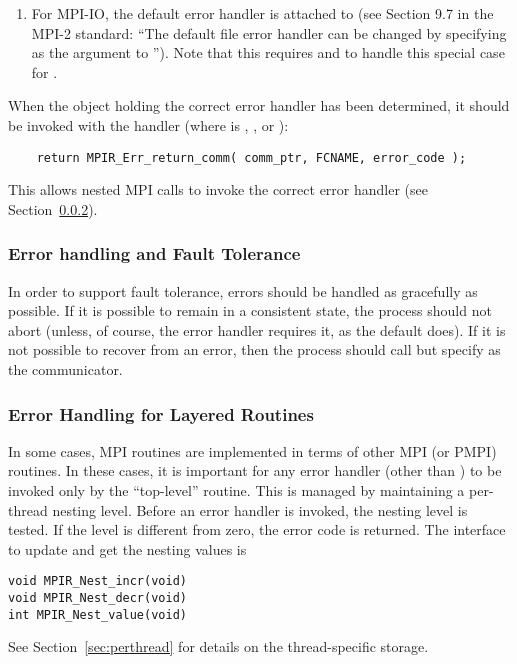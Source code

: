 \documentclass{article}
\begin{document}
\begin{enumerate}
\item For MPI-IO, the default error handler is attached to
   (see Section 9.7 in the MPI-2 standard: ``The default
  file error handler can be changed by specifying  as the
   argument to '').  Note that this
  requires  and
   to handle this special case for
  .  
\end{enumerate}

When the object holding the correct error handler has been determined, it
should be invoked with the 
 handler (where  is ,
, or ): %
\begin{verbatim}
    return MPIR_Err_return_comm( comm_ptr, FCNAME, error_code );
\end{verbatim}
This allows nested MPI calls to invoke the correct error handler (see
Section~\ref{sec:err-handling-nested}).  

\subsubsection{Error handling and Fault Tolerance}
\label{sec:errs-and-faults}
In order to support fault tolerance, errors should be handled as
gracefully as possible.  If it is possible to remain in a consistent
state, the process should not abort (unless, of course, the error
handler requires it, as the default  does).  
If it is not possible to recover from an error, then the process
should call  but specify  as the
communicator.  

\subsubsection{Error Handling for Layered Routines}
\label{sec:err-handling-nested}
In some cases, MPI routines are implemented in terms of other MPI (or
PMPI) routines.  In these cases, it is important for any error handler
(other than ) to be invoked only by the
``top-level'' routine.  
This is managed by maintaining a per-thread nesting level.  Before an error
handler is invoked, the nesting level is tested.  If the level is different
from zero, the error code is returned.  The interface to update and
get the nesting values is
\begin{verbatim}
void MPIR_Nest_incr(void)
void MPIR_Nest_decr(void)
int MPIR_Nest_value(void)
\end{verbatim}
See Section~\ref{sec:perthread} for details on the thread-specific storage.
\end{document}
